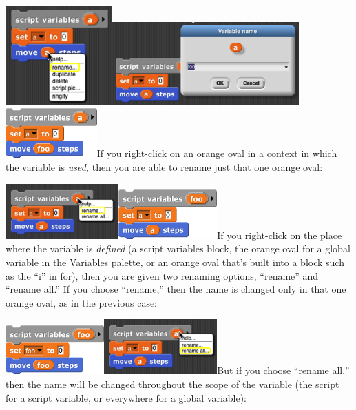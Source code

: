 \includegraphics[width=1.61389in,height=1.50764in]{media/image107.png}\includegraphics[width=2.82639in,height=1.25694in]{media/image108.png}\includegraphics[width=1.38194in,height=0.74306in]{media/image109.png}If
you right-click on an orange oval in a context in which the variable is
\emph{used,} then you are able to rename just that one orange oval:

\includegraphics[width=1.70833in,height=0.83333in]{media/image110.png}\includegraphics[width=1.49306in,height=0.74306in]{media/image111.png}If
you right-click on the place where the variable is \emph{defined} (a
script variables block, the orange oval for a global variable in the
Variables palette, or an orange oval that's built into a block such as
the ``i'' in for), then you are given two renaming options, ``rename''
and ``rename all.'' If you choose ``rename,'' then the name is changed
only in that one orange oval, as in the previous case:

\includegraphics[width=1.49306in,height=0.74306in]{media/image112.png}\includegraphics[width=1.70833in,height=0.83333in]{media/image113.png}But
if you choose ``rename all,'' then the name will be changed throughout
the scope of the variable (the script for a script variable, or
everywhere for a global variable):

